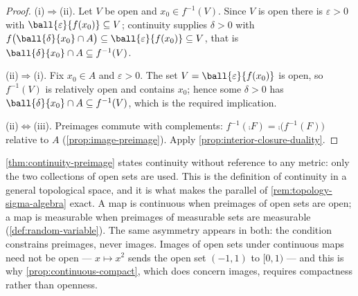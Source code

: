 \begin{proof}
	(i)$\Rightarrow$(ii). Let $V$ be open and $x_0\in f^{-1}(V)$. Since $V$ is open
	there is $\varepsilon>0$ with $\ball{\varepsilon}{f(x_0)}\subseteq V$;
	continuity supplies $\delta>0$ with
	$f\bigl(\ball{\delta}{x_0}\cap A\bigr)\subseteq\ball{\varepsilon}{f(x_0)}
		\subseteq V$, that is $\ball{\delta}{x_0}\cap A\subseteq f^{-1}(V)$.

	(ii)$\Rightarrow$(i). Fix $x_0\in A$ and $\varepsilon>0$. The set
	$V=\ball{\varepsilon}{f(x_0)}$ is open, so $f^{-1}(V)$ is relatively open and
	contains $x_0$; hence some $\delta>0$ has
	$\ball{\delta}{x_0}\cap A\subseteq f^{-1}(V)$, which is the required
	implication.

	(ii)$\Leftrightarrow$(iii). Preimages commute with complements:
	$f^{-1}(\comp{F})=\comp{\bigl(f^{-1}(F)\bigr)}$ relative to $A$
	(\autoref{prop:image-preimage}). Apply
	\autoref{prop:interior-closure-duality}.
\end{proof}

\begin{remark}
	\label{rem:continuity-measurability}
	\autoref{thm:continuity-preimage} states continuity without reference to any
	metric: only the two collections of open sets are used. This is the definition of
	continuity in a general topological space, and it is what makes the parallel of
	\autoref{rem:topology-sigma-algebra} exact. A map is continuous when preimages
	of open sets are open; a map is measurable when preimages of measurable sets are
	measurable (\autoref{def:random-variable}). The same asymmetry appears in both:
	the condition constrains preimages, never images. Images of open sets under
	continuous maps need not be open --- $x\mapsto x^2$ sends the open set
	$(-1,1)$ to $[0,1)$ --- and this is why \autoref{prop:continuous-compact}, which
	does concern images, requires compactness rather than openness.
\end{remark}

